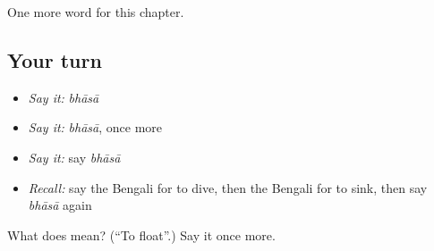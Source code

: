 \begin{grammarlens}[title={What you've built}]
One more word for this chapter.
\end{grammarlens}

\subsection*{Your turn}
\begin{itemize}
\raggedright
  \item \emph{Say it:} \emph{bhāsā}
  \item \emph{Say it:} \emph{bhāsā}, once more
  \item \emph{Say it:} say \emph{bhāsā}
  \item \emph{Recall:} say the Bengali for to dive, then the Bengali for to sink, then say \emph{bhāsā} again
\end{itemize}

\begin{tcolorbox}[breakable,colback=teal!4,colframe=teal!35!black,title={Before you move on}]
What does  mean? (\textquotedblleft{}To float\textquotedblright{}.) Say it once more.
\end{tcolorbox}
